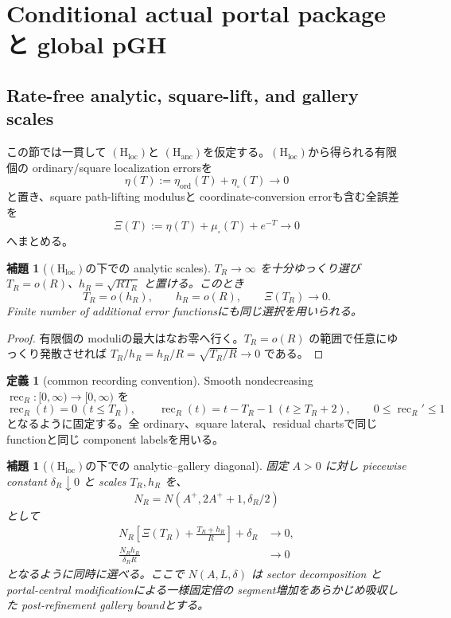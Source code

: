 \documentclass[11pt,a4paper]{ltjsarticle}
\newcommand{\Hloc}{\ensuremath{(\mathrm H_{\mathrm{loc}})}}
\newcommand{\Hanc}{\ensuremath{(\mathrm H_{\mathrm{anc}})}}
\theoremstyle{plain}
\newtheorem{lemma}[theorem]{補題}\newtheorem{corollary}[theorem]{系}
\theoremstyle{definition}
\newtheorem{definition}[theorem]{定義}\newtheorem{hypothesis}[theorem]{仮定}
\theoremstyle{remark}
\begin{document}
\section{Conditional actual portal package と global pGH}\label{sec:actual-portal}

\subsection{Rate-free analytic, square-lift, and gallery scales}
この節では一貫して \Hloc と \Hanc を仮定する。\Hloc から得られる有限個の ordinary/square localization errorsを
\[
 \eta(T):=\eta_{\mathrm{ord}}(T)+\eta_{\square}(T)
 \longrightarrow0
\]
と置き、square path-lifting modulusと coordinate-conversion errorも含む全誤差を
\[
 \Xi(T):=\eta(T)+\mu_\square(T)+e^{-T}
 \longrightarrow0
\]
へまとめる。

\begin{lemma}[\Hloc の下での analytic scales]\label{lem:portal-scales}
$T_R\to\infty$ を十分ゆっくり選び $T_R=o(R)$、$h_R=\sqrt{RT_R}$ と置ける。このとき
\[
 T_R=o(h_R),\qquad h_R=o(R),\qquad \Xi(T_R)\to0.
\]
Finite number of additional error functionsにも同じ選択を用いられる。
\end{lemma}

\begin{proof}
有限個の moduliの最大はなお零へ行く。$T_R=o(R)$ の範囲で任意にゆっくり発散させれば $T_R/h_R=h_R/R=\sqrt{T_R/R}\to0$ である。
\end{proof}

\begin{definition}[common recording convention]\label{def:recording-convention}
Smooth nondecreasing $\operatorname{rec}_R:[0,\infty)\to[0,\infty)$ を
\[
 \operatorname{rec}_R(t)=0\ (t\le T_R),\qquad
 \operatorname{rec}_R(t)=t-T_R-1\ (t\ge T_R+2),\qquad
 0\le\operatorname{rec}_R'\le1
\]
となるように固定する。全 ordinary、square lateral、residual chartsで同じ functionと同じ component labelsを用いる。
\end{definition}

\begin{lemma}[\Hloc の下での analytic--gallery diagonal]\label{lem:portal-gallery-diagonal}
固定 $A>0$ に対し piecewise constant $\delta_R\downarrow0$ と scales $T_R,h_R$ を、
\[
 N_R=N(A^+,2A^++1,\delta_R/2)
\]
として
\begin{align}
 N_R\left[\Xi(T_R)+\frac{T_R+h_R}{R}\right]+\delta_R&\longrightarrow0,
 \label{eq:gallery-diagonal-one}\\
 \frac{N_Rh_R}{\delta_R R}&\longrightarrow0
 \label{eq:gallery-diagonal-two}
\end{align}
となるように同時に選べる。ここで $N(A,L,\delta)$ は sector decomposition と portal-central modificationによる一様固定倍の segment増加をあらかじめ吸収した post-refinement gallery boundとする。
\end{lemma}
\end{document}
